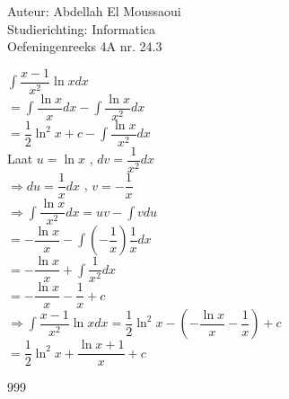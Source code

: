 \documentclass[a4paper]{article}
\begin{document}
  
\noindent \large Auteur: Abdellah El Moussaoui \\
\noindent \large Studierichting: Informatica\\
\noindent \large Oefeningenreeks 4A nr. 24.3\\

\medskip

\normalsize

$\displaystyle\int \dfrac{x-1}{x^2}\ln xdx$\\

$=\displaystyle\int \dfrac{\ln x}{x}dx-\displaystyle\int \dfrac{\ln x}{x^2}dx$\\

$=\dfrac{1}{2}\ln^2x+c-\displaystyle\int \dfrac{\ln x}{x^2}dx$\\

Laat $u=\ln x$ , $dv=\dfrac{1}{x^2}dx$\\

$\Rightarrow du=\dfrac{1}{x}dx$ , $v=-\dfrac{1}{x}$\\

$\Rightarrow \displaystyle\int \dfrac{\ln x}{x^2}dx
=uv-\displaystyle\int vdu$\\

$=-\dfrac{\ln x}{x}-\displaystyle\int \left(-\dfrac{1}{x}\right)\dfrac{1}{x}dx$\\

$=-\dfrac{\ln x}{x}+\displaystyle\int \dfrac{1}{x^2}dx$\\

$=-\dfrac{\ln x}{x}-\dfrac{1}{x} +c$\\

$\Rightarrow \displaystyle\int \dfrac{x-1}{x^2}\ln xdx
=\dfrac{1}{2}\ln^2x-\left(-\dfrac{\ln x}{x}-\dfrac{1}{x}\right)+c$\\

$=\boxed{\dfrac{1}{2}\ln^2x+\dfrac{\ln x+1}{x}+c}$\\

\begin{thebibliography}{999}
\end{thebibliography}
\end{document}
